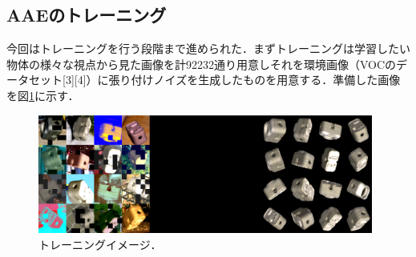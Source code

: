 \documentclass[11pt,a4j,ascmac]{jarticle}
\begin{document}

\subsection{AAEのトレーニング}
\quad  今回はトレーニングを行う段階まで進められた．まずトレーニングは学習したい物体の様々な視点から見た画像を計92232通り用意しそれを環境画像（VOCのデータセット[3][4]）に張り付けノイズを生成したものを用意する．準備した画像を図\ref{fig:style3}に示す．

\begin{figure}[htbp]
 \centering
  \includegraphics[width=110mm]{pic2.eps}
  \vspace*{25mm}
  \caption[図.1]{トレーニングイメージ．}
  \label{fig:style3}
\end{figure}









\end{document}
